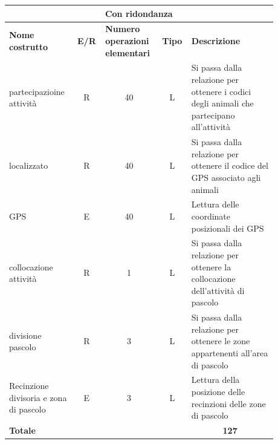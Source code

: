 \documentclass[12pt,a4paper]{article}
\begin{document}
\begin{center}\setlength{\extrarowheight}{1.5pt}\begin{longtable}{|p{0.2\linewidth}|p{0.1\linewidth}|p{0.175\linewidth}|p{0.1\linewidth}|p{0.3\linewidth}|}
\hline
\multicolumn{5}{|c|}{Con ridondanza}
\\
\hline \textbf{Nome costrutto}   & \multicolumn{1}{|c|}{\textbf{E/R}} & \textbf{Numero operazioni elementari} & \multicolumn{1}{|c|}{\textbf{Tipo}} & \textbf{Descrizione}\\ 

\hline
partecipazioine attività
 & 
\multicolumn{1}{|c|}{R}
 & 
\multicolumn{1}{|c|}{40}
 & 
\multicolumn{1}{|c|}{L}
 & 
Si passa dalla relazione per ottenere i codici degli animali che partecipano all'attività
\\
\hline
localizzato
 & 
\multicolumn{1}{|c|}{R}
 & 
\multicolumn{1}{|c|}{40}
 & 
\multicolumn{1}{|c|}{L}
 & 
Si passa dalla relazione per ottenere il codice del GPS associato agli animali
\\
\hline
GPS
 & 
\multicolumn{1}{|c|}{E}
 & 
\multicolumn{1}{|c|}{40}
 & 
\multicolumn{1}{|c|}{L}
 & 
Lettura delle coordinate posizionali dei GPS
\\
\hline
collocazione attività
 & 
\multicolumn{1}{|c|}{R}
 & 
\multicolumn{1}{|c|}{1}
 & 
\multicolumn{1}{|c|}{L}
 & 
Si passa dalla relazione per ottenere la collocazione dell'attività di pascolo
\\
\hline
divisione pascolo
 & 
\multicolumn{1}{|c|}{R}
 & 
\multicolumn{1}{|c|}{3}
 & 
\multicolumn{1}{|c|}{L}
 & 
Si passa dalla relazione per ottenere le zone appartenenti all'area di pascolo
\\
\hline
Recinzione divisoria e zona di pascolo
 & 
\multicolumn{1}{|c|}{E}
 & 
\multicolumn{1}{|c|}{3}
 & 
\multicolumn{1}{|c|}{L}
 & 
Lettura della posizione delle recinzioni delle zone di pascolo
\\
\hline
\multicolumn{4}{|l|}{\textbf{Totale}}
 & 
\multicolumn{1}{|c|}{\textbf{127}}
\\
\hline
\end{longtable}\end{center}
\end{document}
